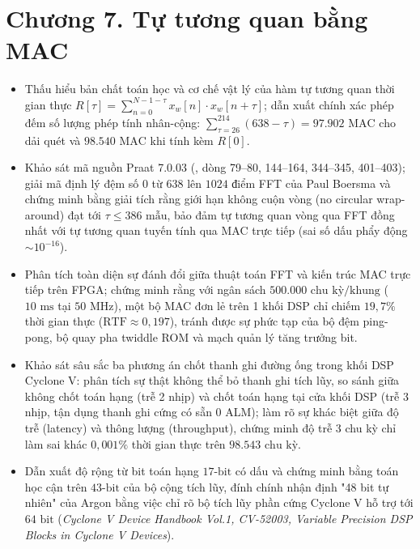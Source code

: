 \providecommand{\todo}[1]{\textcolor{red}{\textbf{[TODO: #1]}}}
\clearpage
{}
\section*{Chương 7. Tự tương quan bằng MAC}

\begin{learningobj}
\begin{itemize}[leftmargin=1.5em, itemsep=2pt]
    \item Thấu hiểu bản chất toán học và cơ chế vật lý của hàm tự tương quan thời gian thực $R[\tau] = \sum_{n=0}^{N-1-\tau} x_w[n] \cdot x_w[n+\tau]$; dẫn xuất chính xác phép đếm số lượng phép tính nhân-cộng: $\sum_{\tau=26}^{214} (638 - \tau) = 97.902\text{ MAC}$ cho dải quét và $98.540\text{ MAC}$ khi tính kèm $R[0]$.
    \item Khảo sát mã nguồn Praat 7.0.03 (, dòng 79--80, 144--164, 344--345, 401--403); giải mã định lý đệm số $0$ từ $638$ lên $1024\text{ điểm}$ FFT của Paul Boersma và chứng minh bằng giải tích rằng giới hạn không cuộn vòng (no circular wrap-around) đạt tới $\tau \le 386\text{ mẫu}$, bảo đảm tự tương quan vòng qua FFT đồng nhất với tự tương quan tuyến tính qua MAC trực tiếp (sai số dấu phẩy động $\sim 10^{-16}$).
    \item Phân tích toàn diện sự đánh đổi giữa thuật toán FFT và kiến trúc MAC trực tiếp trên FPGA; chứng minh rằng với ngân sách $500.000\text{ chu kỳ/khung}$ ($10\text{ ms}$ tại $50\text{ MHz}$), một bộ MAC đơn lẻ trên 1 khối DSP chỉ chiếm $19{,}7\%$ thời gian thực ($\text{RTF} \approx 0{,}197$), tránh được sự phức tạp của bộ đệm ping-pong, bộ quay pha twiddle ROM và mạch quản lý tăng trưởng bit.
    \item Khảo sát sâu sắc ba phương án chốt thanh ghi đường ống trong khối DSP Cyclone V: phân tích sự thật không thể bỏ thanh ghi tích lũy, so sánh giữa không chốt toán hạng (trễ 2 nhịp) và chốt toán hạng tại cửa khối DSP (trễ 3 nhịp, tận dụng thanh ghi cứng có sẵn 0 ALM); làm rõ sự khác biệt giữa độ trễ (latency) và thông lượng (throughput), chứng minh độ trễ 3 chu kỳ chỉ làm sai khác $0{,}001\%$ thời gian thực trên $98.543\text{ chu kỳ}$.
    \item Dẫn xuất độ rộng từ bit toán hạng $17\text{-bit}$ có dấu và chứng minh bằng toán học cận trên $43\text{-bit}$ của bộ cộng tích lũy, đính chính nhận định "48 bit tự nhiên" của Argon bằng việc chỉ rõ bộ tích lũy phần cứng Cyclone V hỗ trợ tới $64\text{ bit}$ (\emph{Cyclone V Device Handbook Vol.1, CV-52003, Variable Precision DSP Blocks in Cyclone V Devices}).

\end{itemize}
\end{learningobj}
